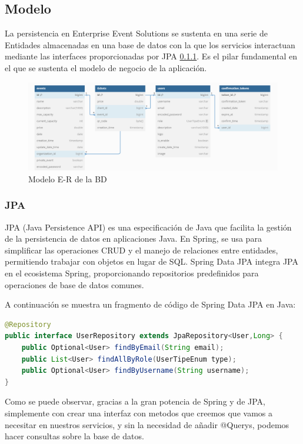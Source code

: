 \subsection{Modelo}
La persistencia en Enterprise Event Solutions se sustenta en una serie de Entidades almacenadas en una base de datos con la que los servicios interactuan mediante
las interfaces proporcionadas por JPA \ref{sec:jpa}. Es el pilar fundamental en el que se sustenta el modelo de negocio de la aplicación.
\begin{figure}[h]
    \centering
    \includegraphics[width=1.2\textwidth]{EVSdiagra.png} 
    \caption{Modelo E-R de la BD}
    \label{fig:diagramaBD}
\end{figure}

\subsubsection{JPA}
\label{sec:jpa}

JPA (Java Persistence API) es una especificación de Java que facilita la gestión de la persistencia de datos en aplicaciones Java.
En Spring, se usa para simplificar las operaciones CRUD y el manejo de relaciones entre entidades, permitiendo trabajar con objetos en lugar de SQL. 
Spring Data JPA integra JPA en el ecosistema Spring, proporcionando repositorios predefinidos para operaciones de base de datos comunes.

A continuación se muestra un fragmento de código de Spring Data JPA en Java:
\myjavastyle
\begin{lstlisting}[language=Java, caption=Ejemplo de Repositorio en Spring Data JPA]
@Repository
public interface UserRepository extends JpaRepository<User,Long> {
    public Optional<User> findByEmail(String email);
    public List<User> findAllByRole(UserTipeEnum type);
    public Optional<User> findByUsername(String username);
}
\end{lstlisting}

Como se puede observar, gracias a la gran potencia de Spring y de JPA, simplemente con crear una interfaz con metodos que creemos que vamos a necesitar en 
nuestros servicios, y sin la necesidad de añadir @Querys, podemos hacer consultas sobre la base de datos.

